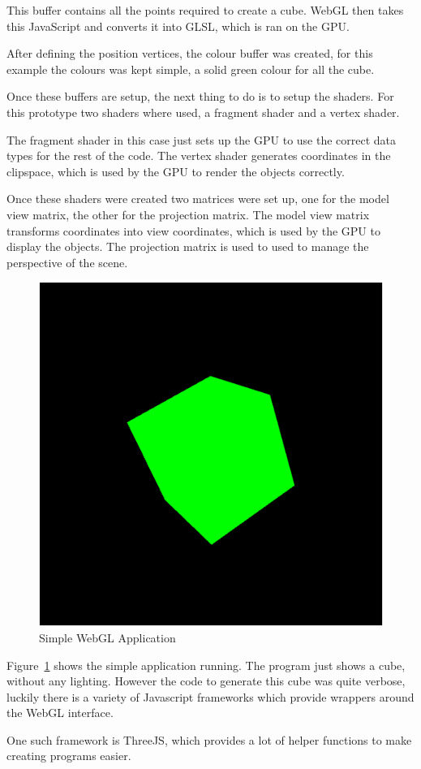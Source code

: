 \documentclass[]{article}
\begin{document}
This buffer contains all the points required to create a cube.
WebGL then takes this JavaScript and converts it into GLSL, which is ran on the GPU.

After defining the position vertices, the colour buffer was created, for this example
the colours was kept simple, a solid green colour for all the cube.

Once these buffers are setup, the next thing to do is to setup the shaders.
For this prototype two shaders where used, a fragment shader and a vertex shader.

The fragment shader in this case just sets up the GPU to use the correct data types for the rest of the code.
The vertex shader generates coordinates in the clipspace, which is used by the GPU to render the objects correctly.

Once these shaders were created two matrices were set up, one for the model view matrix, the other for the projection matrix.
The model view matrix transforms coordinates into view coordinates, which is used by the GPU to display the objects.
The projection matrix is used to used to manage the perspective of the scene.

\begin{figure}[H]
   \centering
   \includegraphics[width=0.5\linewidth]{images/webgl_cube}
   \caption{Simple WebGL Application}
   \label{fig:webgl_cube}
\end{figure}

Figure~\ref{fig:webgl_cube} shows the simple application running.
The program just shows a cube, without any lighting.
However the code to generate this cube was quite verbose, luckily there is a variety of Javascript frameworks which provide wrappers around the WebGL interface.

One such framework is ThreeJS, which provides a lot of helper functions to make creating programs easier.
\end{document}
